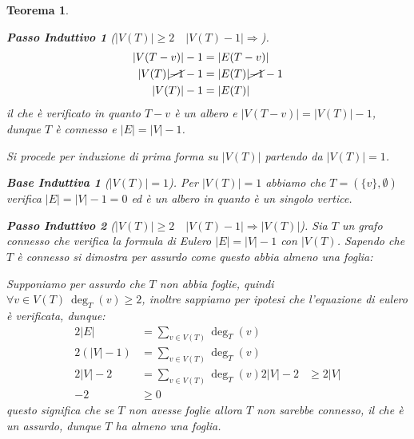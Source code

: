 \documentclass{article}
\makeatletter
\renewenvironment{proof}[1][\proofname]{\par
    \pushQED{\qed}%
    \normalfont \topsep6\p@\@plus6\p@\relax
    \trivlist
    \item\relax
    {\itshape
    #1\@addpunct{.}}\hspace\labelsep\ignorespaces
    }{%
    \popQED\endtrivlist\@endpefalse
}
\newtheorem{theorem}{Teorema}[part]
\theoremstyle{definition}
\newtheorem*{base}{Base Induttiva}
\newtheorem*{step}{Passo Induttivo}
\makeatother
\begin{document}
\begin{theorem}
\begin{proof}
\begin{enumerate}
\begin{step}[$|V(T)|\geq2\quad |V(T)-1|\Longrightarrow$]
\[\begin{aligned}
                                    |V(T-v)|-1&=|E(T-v)|\\
                                    |V(T)|\cancel{-1}-1&=|E(T)|\cancel{-1}-1\\
                                    |V(T)|-1&=|E(T)|
                                \end{aligned}
                            \]
                            il che è verificato in quanto \(T-v\) è un albero e \(|V(T-v)|=|V(T)|-1\), dunque \(T\) è connesso e \(|E|=|V|-1\).
                        \end{step}
                        \popQED{}
                    \item[$1\Leftarrow 5$)] Si procede per induzione di prima forma su \(|V(T)|\) partendo da \(|V(T)|=1\).
                        \begin{base}[$|V(T)|=1$]
                            Per \(|V(T)|=1\) abbiamo che \(T=(\{v\},\emptyset)\) verifica \(|E|=|V|-1=0\) ed è un albero in quanto è un singolo vertice.
                        \end{base}
                        \begin{step}[$|V(T)|\geq2\quad |V(T)-1|\Longrightarrow |V(T)|$]
                            Sia \(T\) un grafo connesso che verifica la formula di Eulero \(|E|=|V|-1\) con \(|V(T)\).
                            Sapendo che \(T\) è connesso si dimostra per assurdo come questo abbia almeno una foglia: 
                            \begin{proof}
                                Supponiamo per assurdo che \(T\) non abbia foglie, quindi \(\forall v\in V(T)\ \deg_T(v)\geq 2\), inoltre sappiamo per ipotesi che l'equazione di eulero è verificata, dunque: \[
                                    \begin{aligned}
                                        2|E|&=\sum_{v\in V(T)}\deg_T(v)\\
                                        2(|V|-1)&=\sum_{v\in V(T)}\deg_T(v)\\
                                        2|V|-2&=\sum_{v\in V(T)}\deg_T(v)
                                        2|V|-2&\geq 2|V|\\
                                        -2&\geq 0
                                    \end{aligned}
                                \]
                                questo significa che se \(T\) non avesse foglie allora \(T\) non sarebbe connesso, il che è un assurdo, dunque \(T\) ha almeno una foglia.

\end{proof}
\end{step}
\end{enumerate}
\end{proof}
\end{theorem}
\end{document}
